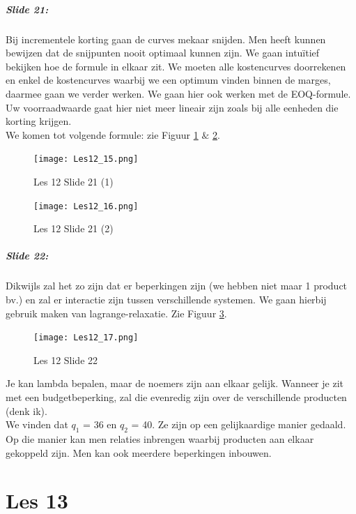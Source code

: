 \documentclass[10pt,a4paper]{report}
\begin{document}
\paragraph{Slide 21:} Bij incrementele korting gaan de curves mekaar snijden. Men heeft kunnen bewijzen dat de snijpunten nooit optimaal kunnen zijn. We gaan intu\"itief bekijken hoe de formule in elkaar zit.
We moeten alle kostencurves doorrekenen en enkel de kostencurves waarbij we een optimum vinden binnen de marges, daarmee gaan we verder werken. We gaan hier ook werken met de EOQ-formule.\\
Uw voorraadwaarde gaat hier niet meer lineair zijn zoals bij alle eenheden die korting krijgen.\\
We komen tot volgende formule: zie Figuur \ref{les12_15} $\&$ \ref{les12_16}.

\begin{figure}[h!]
\centering
\texttt{[image: Les12\_15.png]}
\caption{Les 12 Slide 21 (1)} 
\label{les12_15}
\end{figure}

\begin{figure}[h!]
\centering
\texttt{[image: Les12\_16.png]}
\caption{Les 12 Slide 21 (2)} 
\label{les12_16}
\end{figure}

\paragraph{Slide 22:} Dikwijls zal het zo zijn dat er beperkingen zijn (we hebben niet maar 1 product bv.) en zal er interactie zijn tussen verschillende systemen. We gaan hierbij gebruik maken van lagrange-relaxatie. Zie Figuur \ref{les12_17}.

\begin{figure}[h!]
\centering
\texttt{[image: Les12\_17.png]}
\caption{Les 12 Slide 22} 
\label{les12_17}
\end{figure}

Je kan lambda bepalen, maar de noemers zijn aan elkaar gelijk. Wanneer je zit met een budgetbeperking, zal die evenredig zijn over de verschillende producten (denk ik).\\
We vinden dat $q_{1}$ = 36 en $q_{2}$ = 40. Ze zijn op een gelijkaardige manier gedaald. \\
Op die manier kan men relaties inbrengen waarbij producten aan elkaar gekoppeld zijn. Men kan ook meerdere beperkingen inbouwen.

\chapter{Les 13}
\end{document}
